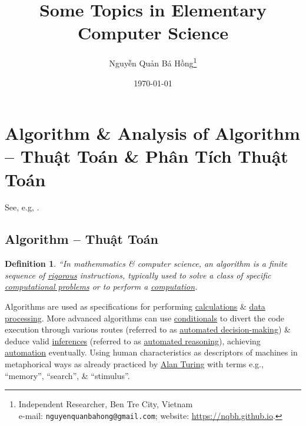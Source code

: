 \documentclass{article}
\title{Some Topics in Elementary Computer Science}
\author{Nguyễn Quản Bá Hồng\footnote{Independent Researcher, Ben Tre City, Vietnam\\e-mail: \texttt{nguyenquanbahong@gmail.com}; website: \url{https://nqbh.github.io}.}}
\date{\today}
\newtheorem{definition}{Definition}
\begin{document}
\maketitle
\begin{abstract}
	
\end{abstract}
\setcounter{secnumdepth}{4}
\setcounter{tocdepth}{3}
\tableofcontents


\section{Algorithm \& Analysis of Algorithm --  Thuật Toán \& Phân Tích Thuật Toán}
See, e.g, \cite[Chuyên đề 1, pp. 5--12]{TLGK_chuyen_Tin_quyen_1}.

\subsection{Algorithm -- Thuật Toán}

\begin{definition}
	``In mathemmatics \& computer science, an \emph{algorithm} is a finite sequence of \href{https://en.wikipedia.org/wiki/Mathematical_proof#Nature_and_purpose}{rigorous} instructions, typically used to solve a class of specific \href{https://en.wikipedia.org/wiki/Computational_problem}{computational problems} or to perform a \href{https://en.wikipedia.org/wiki/Computation}{computation}.
\end{definition}
Algorithms are used as specifications for performing \href{https://en.wikipedia.org/wiki/Calculation}{calculations} \& \href{https://en.wikipedia.org/wiki/Data_processing}{data processing}. More advanced algorithms can use \href{https://en.wikipedia.org/wiki/Conditional_(computer_programming)}{conditionals} to divert the code execution through various routes (referred to as \href{https://en.wikipedia.org/wiki/Automated_decision-making}{automated decision-making}) \& deduce valid \href{https://en.wikipedia.org/wiki/Inference}{inferences} (referred to as \href{https://en.wikipedia.org/wiki/Automated_reasoning}{automated reasoning}), achieving \href{https://en.wikipedia.org/wiki/Automation}{automation} eventually. Using human characteristics as descriptors of machines in metaphorical ways as already practiced by \href{https://en.wikipedia.org/wiki/Alan_Turing}{Alan Turing} with terms e.g., ``memory'', ``search'', \& ``stimulus''.
\end{document}
